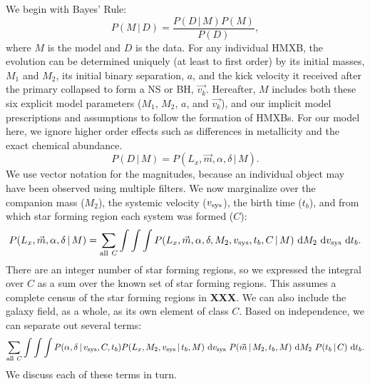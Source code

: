 \documentclass[12pt, preprint]{aastex}
\newcommand{\given}{\,|\,}
\newcommand{\dd}{\mathrm{d}}
\newcommand{\bs}[1]{\boldsymbol{#1}}
\begin{document}
We begin with Bayes' Rule:
\begin{equation}
P( M \given D ) = \frac{P( D \given M ) P(M)}{P(D)},
\end{equation}
where $M$ is the model and $D$ is the data. For any individual HMXB, the evolution can be determined uniquely (at least to first order) by its initial masses, $M_1$ and $M_2$, its initial binary separation, $a$, and the kick velocity it received after the primary collapsed to form a NS or BH, $\vec{v_k}$. Hereafter, $M$ includes both these six explicit model parameters ($M_1$, $M_2$, $a$, and $\vec{v_k}$), and our implicit model prescriptions and assumptions to follow the formation of HMXBs. For our model here, we ignore higher order effects such as differences in metallicity and the exact chemical abundance.
\begin{equation}
P ( D \given M ) = P(L_x, \vec{m}, \alpha, \delta \given M).
\end{equation}
We use vector notation for the magnitudes, because an individual object may have been observed using multiple filters. 
We now marginalize over the companion mass ($M_2$), the systemic velocity ($v_{\rm sys}$), the birth time ($t_b$), and from which star forming region each system was formed ($C$):
\begin{equation}
P( L_x, \vec{m}, \alpha, \delta \given M) = \sum_{{\rm all}\ C} \int \int \int P( L_x, \vec{m}, \alpha, \delta, M_2, v_{\rm sys}, t_b, C \given M)\ \dd M_2\ \dd v_{\rm sys}\ \dd t_b.
\end{equation}
There are an integer number of star forming regions, so we expressed the integral over $C$ as a sum over the known set of star forming regions. This assumes a complete census of the star forming regions in {\bf XXX}. We can also include the galaxy field, as a whole, as its own element of class $C$. Based on independence, we can separate out several terms:
\begin{equation}
\sum_{{\rm all}\ C} \int \int \int P(\alpha, \delta \given v_{\rm sys}, C, t_b) P(L_x, M_2, v_{\rm sys} \given t_b, M)\ \dd v_{\rm sys}\ P(\vec{m} \given M_2, t_b, M)\ \dd M_2\ P(t_b \given C)\ \dd t_b. \label{eq:marginalized}
\end{equation}
We discuss each of these terms in turn. 
\end{document}
